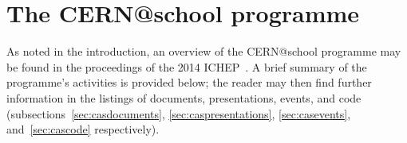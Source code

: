 \section{The CERN@school programme}
\label{sec:cas}
As noted in the introduction, an overview of the CERN@school
programme may be found in the proceedings of the 2014
\ac{ICHEP}~\cite{Whyntie2016b}. A brief summary of the programme's
activities is provided below; the reader may then find further information
in the listings of
documents, %
presentations, %
events, %
and
code %
(subsections~\ref{sec:casdocuments},
\ref{sec:caspresentations},
\ref{sec:casevents},
and~\ref{sec:cascode} respectively).
%
